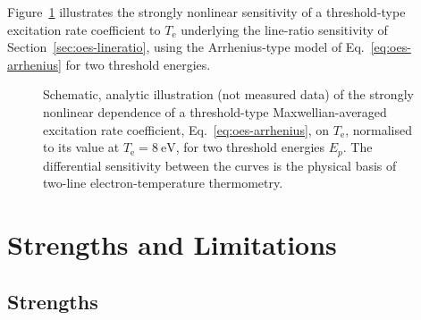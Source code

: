 Figure~\ref{fig:oes-rate-curve} illustrates the strongly nonlinear sensitivity of a threshold-type excitation rate coefficient to $T_{\mathrm{e}}$ underlying the line-ratio sensitivity of Section~\ref{sec:oes-lineratio}, using the Arrhenius-type model of Eq.~\eqref{eq:oes-arrhenius} for two threshold energies.

\begin{figure}[htbp]
\centering
{}
\caption{Schematic, analytic illustration (not measured data) of the strongly nonlinear dependence of a threshold-type Maxwellian-averaged excitation rate coefficient, Eq.~\eqref{eq:oes-arrhenius}, on $T_{\mathrm{e}}$, normalised to its value at $T_{\mathrm{e}}=\SI{8}{\eV}$, for two threshold energies $E_{p}$. The differential sensitivity between the curves is the physical basis of two-line electron-temperature thermometry.}
\label{fig:oes-rate-curve}
\end{figure}

\section{Strengths and Limitations}

\subsection{Strengths}

